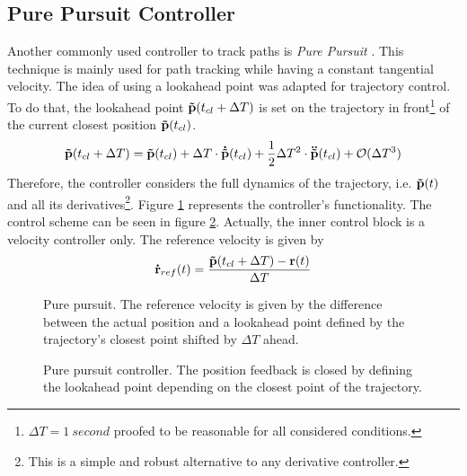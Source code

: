 \subsection{Pure Pursuit Controller}
\label{sub:pure_pursuit}
Another commonly used controller to track paths is \textit{Pure Pursuit} \cite{snider}. This technique is mainly used for path tracking while having a constant tangential velocity. The idea of using a lookahead point was adapted for trajectory control. To do that, the lookahead point ${\bf \tilde{p}}(t_{cl}+\Delta T)$ is set on the trajectory in front\footnote{$\Delta T = \SI{1}{second}$ proofed to be reasonable for all considered conditions.} of the current closest position ${\bf \tilde{p}}(t_{cl})$.
\begin{equation}
{\bf \tilde{p}}(t_{cl}+\Delta T) = {\bf \tilde{p}}(t_{cl}) + \Delta T \cdot {\bf\dot{ \tilde{p}}}(t_{cl}) + \frac{1}{2} \Delta T^2 \cdot {\bf\ddot{ \tilde{p}}}(t_{cl}) + \mathcal{O}(\Delta T^3)
\end{equation}
Therefore, the controller considers the full dynamics of the trajectory, i.e. ${\bf \tilde{p}}(t)$ and all its derivatives\footnote{This is a simple and robust alternative to any derivative controller.}.
Figure \ref{fig:scene_purePursuit} represents the controller's functionality. The control scheme can be seen in figure \ref{fig:purePursuit}. Actually, the inner control block is a velocity controller only. The reference velocity is given by
\begin{equation}
{\bf \dot{r}}_{ref}(t) = \frac{{\bf \tilde{p}}(t_{cl}+\Delta T)-{\bf r}(t)}{\Delta T}
\end{equation}


\begin{figure}[H]
    \centering
    \def\svgwidth{0.5\columnwidth}
    
    \caption{Pure pursuit. The reference velocity is given by the difference between the actual position and a lookahead point defined by the trajectory's closest point shifted by $\Delta T$ ahead.}
    \label{fig:scene_purePursuit}
\end{figure}

\begin{figure}[H]
    \centering
    \def\svgwidth{\columnwidth}
    
    \caption{Pure pursuit controller. The position feedback is closed by defining the lookahead point depending on the closest point of the trajectory.}
    \label{fig:purePursuit}
\end{figure}

